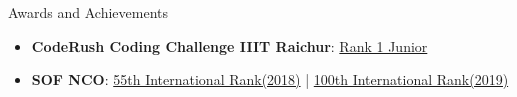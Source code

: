 \documentclass{resume} %
\begin{document}
\begin{rSection}{Awards and Achievements}

 \begin{itemize}
    \itemsep -3pt {}
     \item \textbf{CodeRush Coding Challenge IIIT Raichur}: \href{https://drive.google.com/file/d/1BdOPAlKCXyNEZf-ujJ5Iu8lBBra77hJg/view?usp=sharing}{Rank 1 Junior}
     \item \textbf{SOF NCO}: \href{https://drive.google.com/file/d/1b_JE3MbNI2eW9xpYvC1NWCfUGChuEVBy/view?usp=sharing}{55th International Rank(2018)} | \href{https://drive.google.com/file/d/1bnRRCB6FZKDpJm0-Ogz15o56iG2QN_1t/view?usp=sharing}{100th International Rank(2019)}
 \end{itemize}

\end{rSection}






\end{document}
